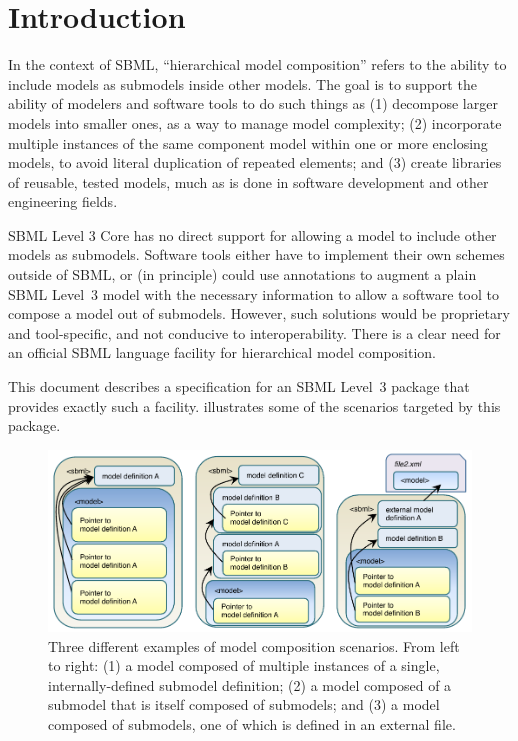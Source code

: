 
\section{Introduction}
\label{intro}

In the context of SBML, ``hierarchical model composition'' refers to the
ability to include models as submodels inside other models. The goal is
to support the ability of modelers and software tools to do such things
as (1) decompose larger models into smaller ones, as a way to manage
model complexity; (2) incorporate multiple instances of the same
component model within one or more enclosing models, to avoid literal
duplication of repeated elements; and (3) create libraries of reusable,
tested models, much as is done in software development and other
engineering fields.

SBML Level 3 Core has no direct support for allowing a model to include
other models as submodels.  Software tools either have to implement
their own schemes outside of SBML, or (in principle) could use
annotations to augment a plain SBML Level~3 model with the necessary
information to allow a software tool to compose a model out of
submodels.  However, such solutions would be proprietary and
tool-specific, and not conducive to interoperability.  There is a clear
need for an official SBML language facility for hierarchical model
composition.

This document describes a specification for an SBML Level~3 package that
provides exactly such a facility.   illustrates some of the
scenarios targeted by this package.

\begin{figure}[hb]
  \includegraphics{figs/figure1}
  \caption{Three different examples of model composition scenarios.
    From left to right: (1) a model composed of multiple instances of a
    single, internally-defined submodel definition; (2) a model composed
    of a submodel that is itself composed of submodels; and (3) a model
    composed of submodels, one of which is defined in an external file.}
  \label{fig1}
\end{figure}

